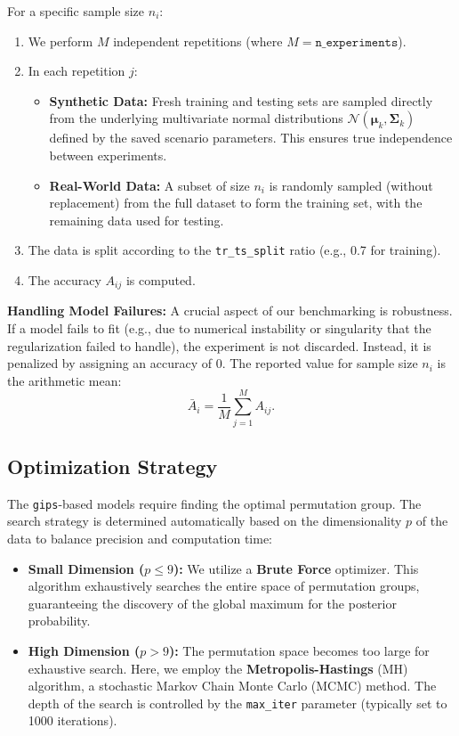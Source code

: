 \documentclass[a4paper,11pt,twoside]{report}
\theoremstyle{definition}
\begin{document}
For a specific sample size $n_i$:
\begin{enumerate}
    \item We perform $M$ independent repetitions (where $M = \texttt{n\_experiments}$).
    \item In each repetition $j$:
    \begin{itemize}
        \item \textbf{Synthetic Data:} Fresh training and testing sets are sampled directly from the underlying multivariate normal distributions $\mathcal{N}(\boldsymbol{\mu}_k, \boldsymbol{\Sigma}_k)$ defined by the saved scenario parameters. This ensures true independence between experiments.
        \item \textbf{Real-World Data:} A subset of size $n_i$ is randomly sampled (without replacement) from the full dataset to form the training set, with the remaining data used for testing.
    \end{itemize}
    \item The data is split according to the \texttt{tr\_ts\_split} ratio (e.g., 0.7 for training).
    \item The accuracy $A_{ij}$ is computed.
\end{enumerate}

\textbf{Handling Model Failures:} A crucial aspect of our benchmarking is robustness. If a model fails to fit (e.g., due to numerical instability or singularity that the regularization failed to handle), the experiment is not discarded. Instead, it is penalized by assigning an accuracy of $0$. The reported value for sample size $n_i$ is the arithmetic mean:
\[ \bar{A}_i = \frac{1}{M} \sum_{j=1}^{M} A_{ij}. \]

\subsection{Optimization Strategy}

The \texttt{gips}-based models require finding the optimal permutation group. The search strategy is determined automatically based on the dimensionality $p$ of the data to balance precision and computation time:

\begin{itemize}
    \item \textbf{Small Dimension ($p \le 9$):} We utilize a \textbf{Brute Force} optimizer. This algorithm exhaustively searches the entire space of permutation groups, guaranteeing the discovery of the global maximum for the posterior probability.
    \item \textbf{High Dimension ($p > 9$):} The permutation space becomes too large for exhaustive search. Here, we employ the \textbf{Metropolis-Hastings} (MH) algorithm, a stochastic Markov Chain Monte Carlo (MCMC) method. The depth of the search is controlled by the \texttt{max\_iter} parameter (typically set to 1000 iterations).
\end{itemize}
\end{document}
